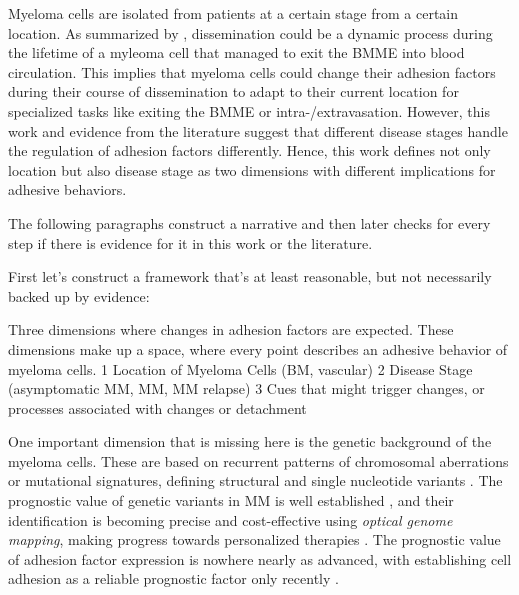 

Myeloma cells are isolated from patients at a certain stage from a certain
location. As summarized by \citet{zeissigTumourDisseminationMultiple2020},
dissemination could be a dynamic process during the lifetime of a myleoma cell
that managed to exit the \ac{BMME} into blood circulation. This implies that
myeloma cells could change their adhesion factors during their course of
dissemination to adapt to their current location for specialized tasks like
exiting the \ac{BMME} or intra-/extravasation. However, this work and evidence
from the literature suggest that different disease stages handle the regulation
of adhesion factors differently. Hence, this work defines not only location but
also disease stage as two dimensions with different implications for adhesive
behaviors.


The following paragraphs construct a narrative and then later checks for every
step if there is evidence for it in this work or the literature.

First let's construct a framework that's at least reasonable, but not necessarily
backed up by evidence:

Three dimensions where changes in adhesion factors are expected. These dimensions
make up a space, where every point describes an adhesive behavior of myeloma cells.
1 Location of Myeloma Cells (BM, vascular)
2 Disease Stage (asymptomatic MM, MM, MM relapse)
3 Cues that might trigger changes, or processes associated with changes or detachment


One important dimension that is missing here is the genetic background of the
myeloma cells. These are based on recurrent patterns of chromosomal aberrations
or mutational signatures, defining structural and single nucleotide variants
\cite{kumarMultipleMyelomasCurrent2018a,
      hoangMutationalProcessesContributing2019}. The prognostic value of genetic
variants in MM is well established \cite{sharmaPrognosticRoleMYC2021}, and their
identification is becoming precise and cost-effective using \emph{optical
      genome mapping}, making progress towards personalized therapies
\cite{zouComprehensiveApproachEvaluate2024,
      budurleanIntegratingOpticalGenome2024}. The prognostic value of adhesion factor
expression is nowhere nearly as advanced, with establishing cell adhesion as a
reliable prognostic factor only recently
\cite{huDevelopmentCellAdhesionbased2024}.



